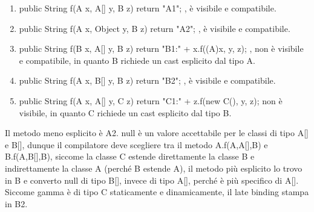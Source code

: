\begin{itemize}
\begin{enumerate}
                \item public String f(A x, A[] y, B z) { return "A1"; }, è visibile e compatibile.
                \item public String f(A x, Object y, B z) { return "A2"; }, è visibile e compatibile.
                \item public String f(B x, A[] y, B z) { return "B1:" + x.f((A)x, y, z); }, non è visibile
                e compatibile, in quanto B richiede un cast esplicito dal tipo A.
                \item public String f(A x, B[] y, B z) { return "B2"; }, è visibile e compatibile.
                \item public String f(A x, A[] y, C z) { return "C1:" + z.f(new C(), y, z); } non è visibile,
                in quanto C richiede un cast esplicito dal tipo B.
            \end{enumerate}
            Il metodo meno esplicito è A2. null è un valore accettabile per le classi di tipo A[] e B[],
            dunque il compilatore deve scegliere tra il metodo A.f(A,A[],B) e B.f(A,B[],B), siccome la
            classe C estende direttamente la classe B e indirettamente la classe A (perché B estende A),
            il metodo più esplicito lo trovo in B e converto null di tipo B[], invece di tipo A[], perché
            è più specifico di A[].
            Siccome gamma è di tipo C staticamente e dinamicamente, il late binding stampa in B2.
        \end{itemize}